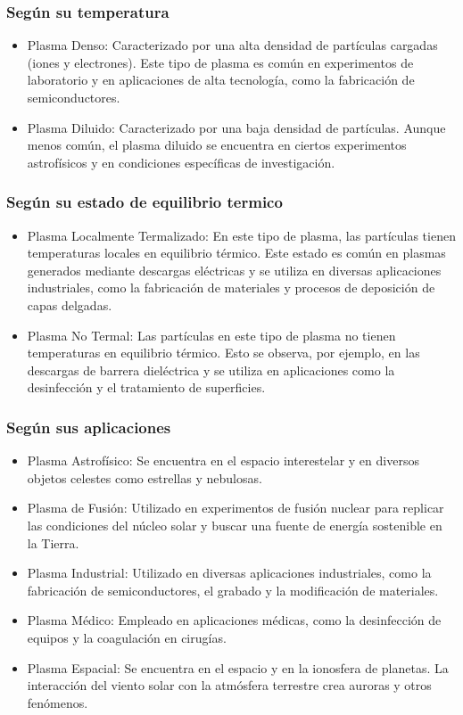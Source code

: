     \subsubsection{Según su temperatura}
        \begin{itemize}
            \item Plasma Denso: Caracterizado por una alta densidad de partículas cargadas (iones y electrones). Este tipo de plasma es común en experimentos de laboratorio y en aplicaciones de alta tecnología, como la fabricación de semiconductores.
            \item Plasma Diluido: Caracterizado por una baja densidad de partículas. Aunque menos común, el plasma diluido se encuentra en ciertos experimentos astrofísicos y en condiciones específicas de investigación.
        \end{itemize}
    \subsubsection{Según su estado de equilibrio termico}
        \begin{itemize}
            \item Plasma Localmente Termalizado: En este tipo de plasma, las partículas tienen temperaturas locales en equilibrio térmico. Este estado es común en plasmas generados mediante descargas eléctricas y se utiliza en diversas aplicaciones industriales, como la fabricación de materiales y procesos de deposición de capas delgadas.
            \item Plasma No Termal: Las partículas en este tipo de plasma no tienen temperaturas en equilibrio térmico. Esto se observa, por ejemplo, en las descargas de barrera dieléctrica y se utiliza en aplicaciones como la desinfección y el tratamiento de superficies.
        \end{itemize}
    \subsubsection{Según sus aplicaciones}
        \begin{itemize}
            \item Plasma Astrofísico: Se encuentra en el espacio interestelar y en diversos objetos celestes como estrellas y nebulosas.
            \item Plasma de Fusión: Utilizado en experimentos de fusión nuclear para replicar las condiciones del núcleo solar y buscar una fuente de energía sostenible en la Tierra.
            \item Plasma Industrial: Utilizado en diversas aplicaciones industriales, como la fabricación de semiconductores, el grabado y la modificación de materiales.
            \item Plasma Médico: Empleado en aplicaciones médicas, como la desinfección de equipos y la coagulación en cirugías.
            \item Plasma Espacial: Se encuentra en el espacio y en la ionosfera de planetas. La interacción del viento solar con la atmósfera terrestre crea auroras y otros fenómenos.
        \end{itemize}

